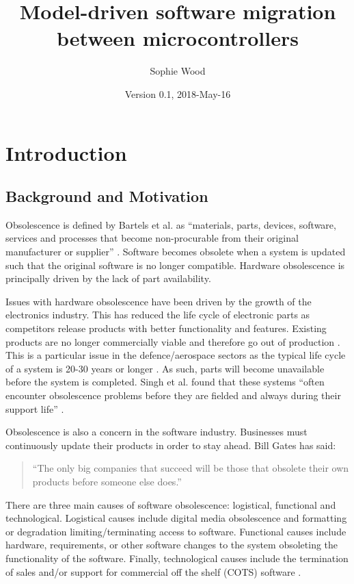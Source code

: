 \documentclass{UoYCSproject}
\author{Sophie Wood}
\title{Model-driven software migration between microcontrollers}
\date{Version 0.1, 2018-May-16}
\begin{document}
\maketitle
\listoffigures
\listoftables

\chapter{Introduction}
\section{Background and Motivation}

Obsolescence is defined by Bartels et al. as ``materials, parts, devices, software, services and processes that become non-procurable from their original manufacturer or supplier'' \parencite{bartels2012strategies}. Software becomes obsolete when a system is updated such that the original software is no longer compatible. Hardware obsolescence is principally driven by the lack of part availability.

Issues with hardware obsolescence have been driven by the growth of the electronics industry. This has reduced the life cycle of electronic parts as competitors release products with better functionality and features. Existing products are no longer commercially viable and therefore go out of production \parencite{bartels2012strategies}. This is a particular issue in the defence/aerospace sectors as the typical life cycle of a system is 20-30 years or longer \parencite{rojo2010obsolescence}. As such, parts will become unavailable before the system is completed. Singh et al. found that these systems ``often encounter obsolescence problems before they are fielded and always during their support life'' \parencite{singh2006obsolescence}.

Obsolescence is also a concern in the software industry. Businesses must continuously update their products in order to stay ahead. Bill Gates has said: 
\begin{quote}
``The only big companies that succeed will be those that obsolete their own products before someone else does.'' \parencite{bartels2012strategies}
\end{quote}
There are three main causes of software obsolescence: logistical, functional and technological. Logistical causes include digital media obsolescence and formatting or degradation limiting/terminating access to software. Functional causes include hardware, requirements, or other software changes to the system obsoleting the functionality of the software. Finally, technological causes include the termination of sales and/or support for commercial off the shelf (COTS) software \parencite{sandborn2007obsolescence}. 
\end{document}
